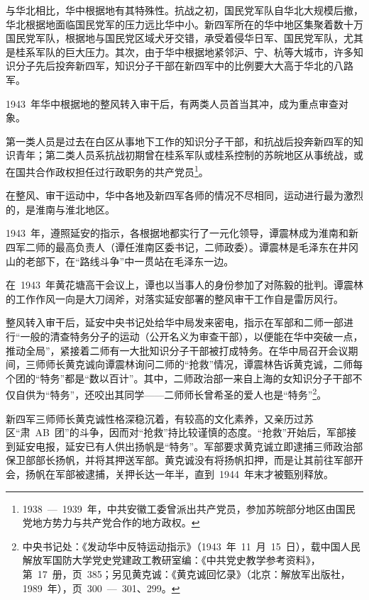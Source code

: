 与华北相比，华中根据地有其特殊性。抗战之初，国民党军队自华北大规模后撤，华北根据地面临国民党军的压力远比华中小。新四军所在的华中地区集聚着数十万国民党军队，根据地与国民党区域犬牙交错，承受着侵华日军、国民党军队，尤其是桂系军队的巨大压力。其次，由于华中根据地紧邻沪、宁、杭等大城市，许多知识分子先后投奔新四军，知识分子干部在新四军中的比例要大大高于华北的八路军。

1943~年华中根据地的整风转入审干后，有两类人员首当其冲，成为重点审查对象。

第一类人员是过去在白区从事地下工作的知识分子干部，和抗战后投奔新四军的知识青年；第二类人员系抗战初期曾在桂系军队或桂系控制的苏皖地区从事统战，或在国共合作政权担任过行政职务的共产党员\footnote{1938~—~1939~年，中共安徽工委曾派出共产党员，参加苏皖部分地区由国民党地方势力与共产党合作的地方政权。}。

在整风、审干运动中，华中各地及新四军各师的情况不尽相同，运动进行最为激烈的，是淮南与淮北地区。

1943~年，遵照延安的指示，各根据地都实行了一元化领导，谭震林成为淮南和新四军二师的最高负责人（谭任淮南区委书记，二师政委）。谭震林是毛泽东在井冈山的老部下，在“路线斗争”中一贯站在毛泽东一边。

在~1943~年黄花塘高干会议上，谭也以当事人的身份参加了对陈毅的批判。谭震林的工作作风一向是大刀阔斧，对落实延安部署的整风审干工作自是雷厉风行。

整风转入审干后，延安中央书记处给华中局发来密电，指示在军部和二师一部进行“一般的清查特务分子的运动（公开名义为审查干部），以便能在华中突破一点，推动全局”，紧接着二师有一大批知识分子干部被打成特务。在华中局召开会议期间，三师师长黄克诚向谭震林询问二师的“抢救”情况，谭震林告诉黄克诚，二师每个团的“特务”都是“数以百计”。其中，二师政治部一来自上海的女知识分子干部不仅自供为“特务”，还咬出其同学——二师师长曾希圣的爱人也是“特务”\footnote{中央书记处：《发动华中反特运动指示》（1943~年~11~月~15~日），载中国人民解放军国防大学党史党建政工教研室编：《中共党史教学参考资料》，第~17~册，页~385；另见黄克诚：《黄克诚回忆录》（北京：解放军出版社，1989~年），页~300~—~301、299。}。

新四军三师师长黄克诚性格深稳沉着，有较高的文化素养，又亲历过苏区“肃~AB~团”的斗争，因而对“抢救”持比较谨慎的态度。“抢救”开始后，军部接到延安电报，延安已有人供出扬帆是“特务”。军部要求黄克诚立即逮捕三师政治部保卫部部长扬帆，并将其押送军部。黄克诚没有将扬帆扣押，而是让其前往军部开会，扬帆在军部被逮捕，关押长达一年半，直到~1944~年末才被甄别释放。

